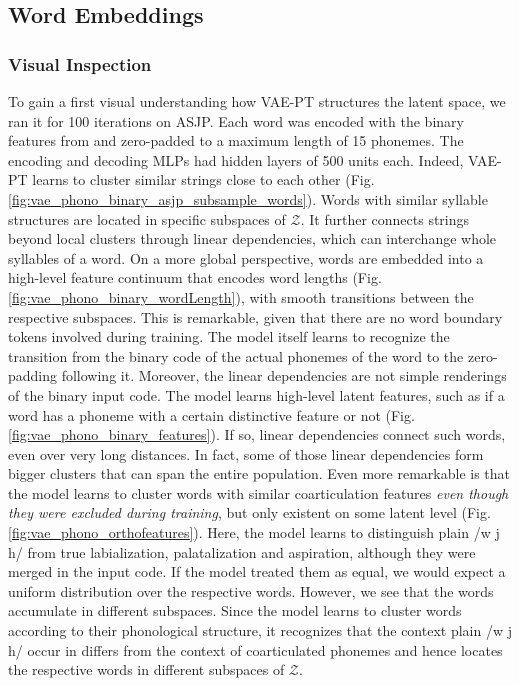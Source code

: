\documentclass[6pt]{article}
\begin{document}
\subsection{Word Embeddings}
\subsubsection{Visual Inspection}
To gain a first visual understanding how VAE-PT structures the latent space, we ran it for 100 iterations on ASJP. Each word was encoded with the binary features from \cite{rama2016siamese} and zero-padded to a maximum length of 15 phonemes. The encoding and decoding MLPs had hidden layers of 500 units each.
Indeed, VAE-PT learns to cluster similar strings close to each other (Fig. \ref{fig:vae_phono_binary_asjp_subsample_words}). Words with similar syllable structures are located in specific subspaces of $\mathcal{Z}$. It further connects strings beyond local clusters through linear dependencies, which can interchange whole syllables of a word. 
On a more global perspective, words are embedded into a high-level feature continuum that encodes word lengths (Fig. \ref{fig:vae_phono_binary_wordLength}), with smooth transitions between the respective subspaces. This is remarkable, given that there are no word boundary tokens involved during training. The model itself learns to recognize the transition from the binary code of the actual phonemes of the word to the zero-padding following it.
Moreover, the linear dependencies are not simple renderings of the binary input code. The model learns high-level latent features, such as if a word has a phoneme with a certain distinctive feature or not (Fig. \ref{fig:vae_phono_binary_features}). If so, linear dependencies connect such words, even over very long distances. In fact, some of those linear dependencies form bigger clusters that can span the entire population. 
Even more remarkable is that the model learns to cluster words with similar coarticulation features \textit{even though they were excluded during training}, but only existent on some latent level (Fig. \ref{fig:vae_phono_orthofeatures}). Here, the model learns to distinguish plain /w j h/ from true labialization, palatalization and aspiration, although they were merged in the input code. If the model treated them as equal, we would expect a uniform distribution over the respective words. However, we see that the words accumulate in different subspaces. Since the model learns to cluster words according to their phonological structure, it recognizes that the context plain /w j h/ occur in differs from the context of coarticulated phonemes and hence locates the respective words in different subspaces of $\mathcal{Z}$.
\end{document}
